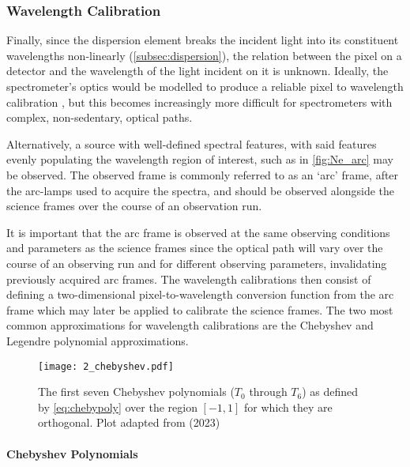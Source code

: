 \subsubsection{Wavelength Calibration}

Finally, since the dispersion element breaks the incident light into its constituent wavelengths non-linearly (\autoref{subsec:dispersion}), the relation between the pixel on a detector and the wavelength of the light incident on it is unknown. Ideally, the spectrometer's optics would be modelled to produce a reliable pixel to wavelength calibration \citep[see E.g.][]{WavCalSpectraModel}, but this becomes increasingly more difficult for spectrometers with complex, non-sedentary, optical paths.

Alternatively, a source with well-defined spectral features, with said features evenly populating the wavelength region of interest, such as in \autoref{fig:Ne_arc} may be observed. The observed frame is commonly referred to as an `arc' frame, after the arc-lamps used to acquire the spectra, and should be observed alongside the science frames over the course of an observation run.

It is important that the arc frame is observed at the same observing conditions and parameters as the science frames since the optical path will vary over the course of an observing run and for different observing parameters, invalidating previously acquired arc frames. The wavelength calibrations then consist of defining a two-dimensional pixel-to-wave\-length conversion function from the arc frame which may later be applied to calibrate the science frames. The two most common approximations for wavelength calibrations are the Chebyshev and Legendre polynomial approximations.

\begin{figure}[t]
    \centering
    \texttt{[image: 2\_chebyshev.pdf]}
    \caption{The first seven Chebyshev polynomials ($T_0$ through $T_{6}$) as defined by \autoref{eq:chebypoly} over the region $[-1, 1]$ for which they are orthogonal. Plot adapted from \citep{numerical_recipes} (2023)\protect\footnotemark}
    \label{fig:chebyshev}
\end{figure}

\paragraph{Chebyshev Polynomials}

